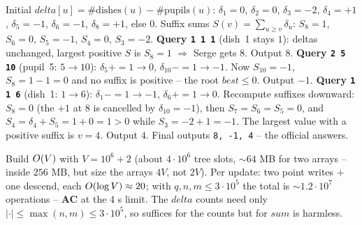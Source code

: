 \begin{tracebox}
Initial \(\mathit{delta}[u]=\#\text{dishes}(u)-\#\text{pupils}(u)\):
\(\delta_1{=}0\), \(\delta_2{=}0\), \(\delta_3{=}{-}2\), \(\delta_4{=}{+}1\),
\(\delta_5{=}{-}1\), \(\delta_6{=}{-}1\), \(\delta_8{=}{+}1\), else \(0\).  Suffix
sums \(S(v)=\sum_{u\ge v}\delta_u\): \(S_8{=}1\), \(S_6{=}0\), \(S_5{=}{-}1\),
\(S_4{=}0\), \(S_3{=}{-}2\).
\textbf{Query \texttt{1 1 1}} (dish~1 stays \(1\)): deltas unchanged, largest
positive \(S\) is \(S_8=1\) \(\Rightarrow\) Serge gets \(8\).  Output \(8\).
\textbf{Query \texttt{2 5 10}} (pupil~5: \(5\to10\)): \(\delta_5{+}{=}1\to0\),
\(\delta_{10}{-}{=}1\to-1\).  Now \(S_{10}{=}{-}1\), \(S_8{=}1{-}1{=}0\) and no suffix
is positive -- the root \(\mathit{best}\le0\).  Output \(-1\).
\textbf{Query \texttt{1 1 6}} (dish~1: \(1\to6\)): \(\delta_1{-}{=}1\to-1\),
\(\delta_6{+}{=}1\to0\).  Recompute suffixes downward: \(S_8{=}0\) (the \(+1\) at
\(8\) is cancelled by \(\delta_{10}{=}{-}1\)), then \(S_7{=}S_6{=}S_5{=}0\), and
\(S_4{=}\delta_4{+}S_5{=}1{+}0{=}1{>}0\) while \(S_3{=}{-}2{+}1{=}{-}1\).  The
largest value with a positive suffix is \(v=4\).  Output \(4\).
Final outputs \texttt{8, -1, 4} -- the official answers.
\end{tracebox}

\begin{complexitybox}
Build \(O(V)\) with \(V=10^6{+}2\) (about \(4\cdot10^6\) tree slots,
\(\sim 64\) MB for two  arrays -- inside \(256\) MB, but size the
arrays \(4V\), not \(2V\)).  Per update: two point writes \(+\) one descend,
each \(O(\log V)\approx 20\); with \(q,n,m\le3\cdot10^5\) the total is
\(\sim 1.2\cdot10^7\) operations -- \textbf{AC} at the \(4\) s limit.  The
\(\mathit{delta}\) counts need only \(|{\cdot}|\le\max(n,m)\le3\cdot10^5\), so
 suffices for the counts but  for \(\mathit{sum}\) is
harmless.
\end{complexitybox}

